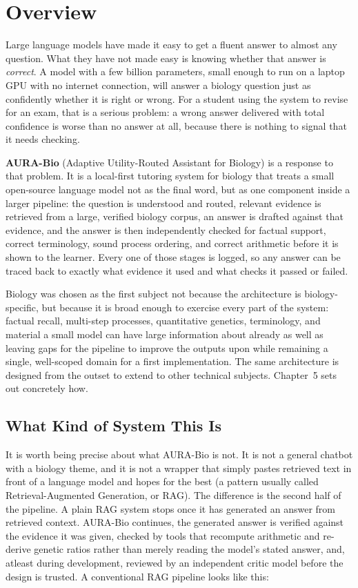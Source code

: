 \section{Overview}\label{1.1}

Large language models have made it easy to get a fluent answer to almost any
question. What they have not made easy is knowing whether that answer is
\emph{correct}. A model with a few billion parameters, small enough to run
on a laptop GPU with no internet connection, will answer a biology question
just as confidently whether it is right or wrong. For a student using the
system to revise for an exam, that is a serious problem: a wrong answer
delivered with total confidence is worse than no answer at all, because
there is nothing to signal that it needs checking.

\textbf{AURA-Bio} (Adaptive Utility-Routed Assistant for Biology) is a
response to that problem. It is a local-first tutoring system for biology
that treats a small open-source language model not as the final word, but as
one component inside a larger pipeline: the question is understood and
routed, relevant evidence is retrieved from a large, verified biology
corpus, an answer is drafted against that evidence, and the answer is then
independently checked for factual support, correct terminology, sound
process ordering, and correct arithmetic before it is shown to the
learner. Every one of those stages is logged, so any answer can be traced
back to exactly what evidence it used and what checks it passed or failed.

Biology was chosen as the first subject not because the architecture is
biology-specific, but because it is broad enough to exercise every part of
the system: factual recall, multi-step processes, quantitative genetics,
terminology, and material a small model can have large information about
already as well as leaving gaps for the pipeline to improve the outputs upon while
remaining a single, well-scoped domain for a first implementation. The same
architecture is designed from the outset to extend to other technical
subjects. Chapter~5 sets out concretely how.

\subsection{What Kind of System This Is}\label{1.1.1}

It is worth being precise about what AURA-Bio is not. It is not a general
chatbot with a biology theme, and it is not a wrapper that simply pastes
retrieved text in front of a language model and hopes for the best (a
pattern usually called Retrieval-Augmented Generation, or RAG). The
difference is the second half of the pipeline. A plain RAG system stops
once it has generated an answer from retrieved context. AURA-Bio continues,
the generated answer is verified against the evidence it was given,
checked by tools that recompute arithmetic and re-derive genetic ratios
rather than merely reading the model's stated answer, and, atleast during
development, reviewed by an independent critic model before the design is
trusted. A conventional RAG pipeline looks like this:

